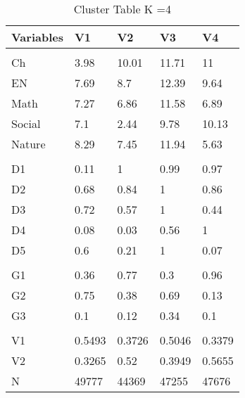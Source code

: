 \begin{table}
\centering
\caption{Cluster Table K =4}
\centering
\begin{tabular}[t]{lllll}
\toprule
Variables & V1 & V2 & V3 & V4\\
\midrule
\addlinespace[0.3em]
\multicolumn{5}{l}{\textbf{GSAT}}\\
\hspace{1em}Ch & 3.98 & 10.01 & 11.71 & 11\\
\hspace{1em}EN & 7.69 & 8.7 & 12.39 & 9.64\\
\hspace{1em}Math & 7.27 & 6.86 & 11.58 & 6.89\\
\hspace{1em}Social & 7.1 & 2.44 & 9.78 & 10.13\\
\hspace{1em}Nature & 8.29 & 7.45 & 11.94 & 5.63\\
\addlinespace[0.3em]
\multicolumn{5}{l}{\textbf{Missing}}\\
\hspace{1em}D1 & 0.11 & 1 & 0.99 & 0.97\\
\hspace{1em}D2 & 0.68 & 0.84 & 1 & 0.86\\
\hspace{1em}D3 & 0.72 & 0.57 & 1 & 0.44\\
\hspace{1em}D4 & 0.08 & 0.03 & 0.56 & 1\\
\hspace{1em}D5 & 0.6 & 0.21 & 1 & 0.07\\
\addlinespace[0.3em]
\multicolumn{5}{l}{\textbf{Choice Set}}\\
\hspace{1em}G1 & 0.36 & 0.77 & 0.3 & 0.96\\
\hspace{1em}G2 & 0.75 & 0.38 & 0.69 & 0.13\\
\hspace{1em}G3 & 0.1 & 0.12 & 0.34 & 0.1\\
\addlinespace[0.3em]
\multicolumn{5}{l}{\textbf{Demographic}}\\
\hspace{1em}V1 & 0.5493 & 0.3726 & 0.5046 & 0.3379\\
\hspace{1em}V2 & 0.3265 & 0.52 & 0.3949 & 0.5655\\
N & 49777 & 44369 & 47255 & 47676\\
\bottomrule
\end{tabular}
\end{table}
